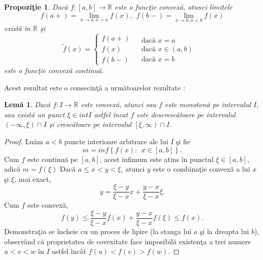 \documentclass[a4paper,12pt,oneside]{report}
\newtheorem{proposition}{Propozi\c tie}
\newtheorem{lemma}{Lem\u{a}}
\begin{document}
\begin{proposition}
Dac\u{a} \(f: \left [ a, b \right ]\rightarrow \mathbb{R}\) este o func\c{t}ie convex\u{a}, atunci limitele
\[
f\left ( a+ \right ) = \lim_{x\rightarrow a, x> a}f\left ( x \right ),~~ f\left ( b- \right ) = \lim_{x\rightarrow b, x< b}f\left ( x \right )\] exist\u{a} \^{i}n \(\mathbb{R}\) \c{s}i
\begin{displaymath}
  \tilde{f}\left ( x \right )= \left\{\begin{matrix}
f\left ( a+ \right ) & \\
 f\left ( x \right )& \\
 f\left ( b- \right )&
\end{matrix} \begin{matrix}
\text{dac\u{a} } x=a & \\
\text{dac\u{a} } x\in \left ( a,b \right ) & \\
\text{dac\u{a} } x= b&
\end{matrix}\right.
\end{displaymath}
 este o func\c{t}ie convex\u{a} continu\u{a}.
\end{proposition}
  Acest rezultat este o consecin\c{t}\u{a} a urm\u{a}toarelor rezultate :
\begin{lemma}

Dac\u{a} \(f: I \rightarrow \mathbb{R}\) este convex\u{a}, atunci sau \(f\) este monoton\u{a} pe intervalul \(I\), sau exist\u{a} un punct \(\xi \in int I\) astfel \^{i}ncat \(f\) este descresc\u{a}toare pe intervalul \(\left ( -\infty , \xi  \right )\cap I\) \c{s}i cresc\u{a}toare pe intervalul \(\left[\xi , \infty  \right )\cap I\).
\end{lemma}
\begin{proof}
Lu\u{a}m \(a < b\) puncte interioare arbitrare ale lui \(I\) \c{s}i fie
\[m = inf\left \{ f\left ( x \right ): ~~x\in \left [ a,b \right ]\right \}.\] Cum \(f\) este continu\u{a} pe \(\left [ a,b \right ]\), acest infimum este atins \^{i}n punctul \(\xi \in \left [ a,b \right ]\), adic\u{a}
$
  m = f\left ( \xi  \right )
$
Dac\u{a} \(a \leq x <  y< \xi\), atunci \(y\) este o combina\c{t}ie convex\u{a} a lui \(x\) \c{s}i \(\xi\), mai exact, \[y = \frac{\xi -y}{\xi -x}x + \frac{y - x}{\xi -x}\xi.\] Cum \(f\) este convex\u{a},
\begin{displaymath}
  f\left ( y \right )\leq \frac{\xi -y}{\xi -x}f\left ( x \right )+ \frac{y-x}{\xi -x}f\left ( \xi  \right )\leq f\left ( x \right ).
\end{displaymath}
Demonstra\c{t}ia se \^{i}ncheie cu un proces de lipire (la stanga lui \(a\) \c{s}i la dreapta lui \(b\)), observ\^{a}nd c\u{a} proprietatea de covexitate face imposibil\u{a} existen\c{t}a a trei numere \(u < v < w\) \^{i}n \(I\) astfel \^{i}nc\^{a}t \(f\left ( u \right ) < f\left ( v \right )> f\left ( w \right )\).
\end{proof}
\end{document}
